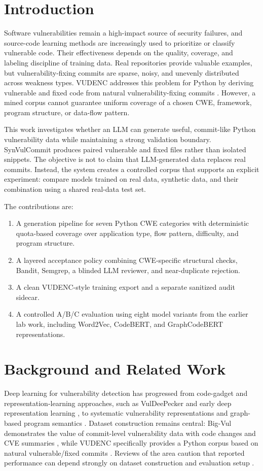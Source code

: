 \section{Introduction}
Software vulnerabilities remain a high-impact source of security failures, and source-code learning methods are increasingly used to prioritize or classify vulnerable code. Their effectiveness depends on the quality, coverage, and labeling discipline of training data. Real repositories provide valuable examples, but vulnerability-fixing commits are sparse, noisy, and unevenly distributed across weakness types. VUDENC addresses this problem for Python by deriving vulnerable and fixed code from natural vulnerability-fixing commits \cite{vudenc}. However, a mined corpus cannot guarantee uniform coverage of a chosen CWE, framework, program structure, or data-flow pattern.

This work investigates whether an LLM can generate useful, commit-like Python vulnerability data while maintaining a strong validation boundary. SynVulCommit produces paired vulnerable and fixed files rather than isolated snippets. The objective is not to claim that LLM-generated data replaces real commits. Instead, the system creates a controlled corpus that supports an explicit experiment: compare models trained on real data, synthetic data, and their combination using a shared real-data test set.

The contributions are:
\begin{enumerate}
  \item A generation pipeline for seven Python CWE categories with deterministic quota-based coverage over application type, flow pattern, difficulty, and program structure.
  \item A layered acceptance policy combining CWE-specific structural checks, Bandit, Semgrep, a blinded LLM reviewer, and near-duplicate rejection.
  \item A clean VUDENC-style training export and a separate sanitized audit sidecar.
  \item A controlled A/B/C evaluation using eight model variants from the earlier lab work, including Word2Vec, CodeBERT, and GraphCodeBERT representations.
\end{enumerate}

\section{Background and Related Work}
Deep learning for vulnerability detection has progressed from code-gadget and representation-learning approaches, such as VulDeePecker \cite{vuldeepecker} and early deep representation learning \cite{russell2018}, to systematic vulnerability representations \cite{sysevr} and graph-based program semantics \cite{devign}. Dataset construction remains central: Big-Vul demonstrates the value of commit-level vulnerability data with code changes and CVE summaries \cite{bigvul}, while VUDENC specifically provides a Python corpus based on natural vulnerable/fixed commits \cite{vudenc}. Reviews of the area caution that reported performance can depend strongly on dataset construction and evaluation setup \cite{chakraborty2022}.

